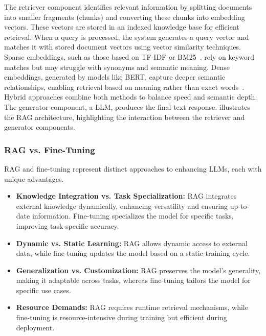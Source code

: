 The retriever component identifies relevant information by splitting documents into smaller fragments (chunks) and converting these chunks into embedding vectors.
%
These vectors are stored in an indexed knowledge base for efficient retrieval.
%
When a query is processed, the system generates a query vector and matches it with stored document vectors using vector similarity techniques.
%
Sparse embeddings, such as those based on TF-IDF or BM25~\cite{DBLP:books/cu/LeskovecRU14,DBLP:journals/ftir/RobertsonZ09}, rely on keyword matches but may struggle with synonyms and semantic meaning.
%
Dense embeddings, generated by models like \gls{BERT}, capture deeper semantic relationships, enabling retrieval based on meaning rather than exact words~\cite{DBLP:conf/naacl/DevlinCLT19}.
%
Hybrid approaches combine both methods to balance speed and semantic depth.
%
The generator component, a \gls{LLM}, produces the final text response.
%
 illustrates the \gls{RAG} architecture, highlighting the interaction between the retriever and generator components.


\subsubsection{\gls{RAG} vs. Fine-Tuning}
\gls{RAG} and fine-tuning represent distinct approaches to enhancing \glspl{LLM}, each with unique advantages.
%
\begin{itemize}
    \item \textbf{Knowledge Integration vs. Task Specialization:} \gls{RAG} integrates external knowledge dynamically, enhancing versatility and ensuring up-to-date information.
    Fine-tuning specializes the model for specific tasks, improving task-specific accuracy.
    \item \textbf{Dynamic vs. Static Learning:} \gls{RAG} allows dynamic access to external data, while fine-tuning updates the model based on a static training cycle.
    \item \textbf{Generalization vs. Customization:} \gls{RAG} preserves the model's generality, making it adaptable across tasks, whereas fine-tuning tailors the model for specific use cases.
    \item \textbf{Resource Demands:} \gls{RAG} requires runtime retrieval mechanisms, while fine-tuning is resource-intensive during training but efficient during deployment.
\end{itemize}

